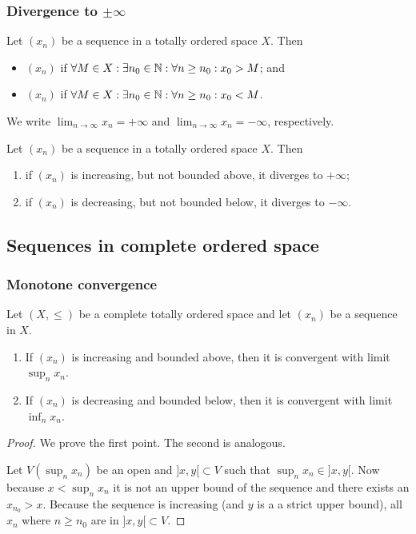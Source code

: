 \subsubsection{Divergence to $\pm\infty$}
\begin{definition}
Let $(x_n)$ be a sequence in a totally ordered space $X$. Then
\begin{itemize}
\item $(x_n)$  if $\forall M\in X: \exists n_0\in\mathbb{N}: \forall n\geq n_0: x_0 > M$; and
\item $(x_n)$  if $\forall M\in X: \exists n_0\in\mathbb{N}: \forall n\geq n_0: x_0 < M$.
\end{itemize}
We write $\lim_{n\to\infty}x_n = +\infty$ and $\lim_{n\to\infty}x_n = -\infty$, respectively.
\end{definition}

\begin{lemma}
Let $(x_n)$ be a sequence in a totally ordered space $X$. Then
\begin{enumerate}
\item if $(x_n)$ is increasing, but not bounded above, it diverges to $+\infty$;
\item if $(x_n)$ is decreasing, but not bounded below, it diverges to $-\infty$.
\end{enumerate}
\end{lemma}

\subsection{Sequences in complete ordered space}
\subsubsection{Monotone convergence}
\begin{proposition} \label{sequenceMonotoneConvergence}
Let $(X,\leq)$ be a complete totally ordered space and let $(x_n)$ be a sequence in $X$.
\begin{enumerate}
\item If $(x_n)$ is increasing and bounded above, then it is convergent with limit $\sup_n x_n$.
\item If $(x_n)$ is decreasing and bounded below, then it is convergent with limit $\inf_n x_n$.
\end{enumerate}
\end{proposition}
\begin{proof}
We prove the first point. The second is analogous.

Let $V(\sup_n x_n)$ be an open and $]x,y[\subset V$ such that $\sup_n x_n \in ]x,y[$. Now because $x<\sup_n x_n$ it is not an upper bound of the sequence and there exists an $x_{n_0}> x$. Because the sequence is increasing (and $y$ is a a strict upper bound), all $x_n$ where $n\geq n_0$ are in $]x,y[\subset V$.
\end{proof}

